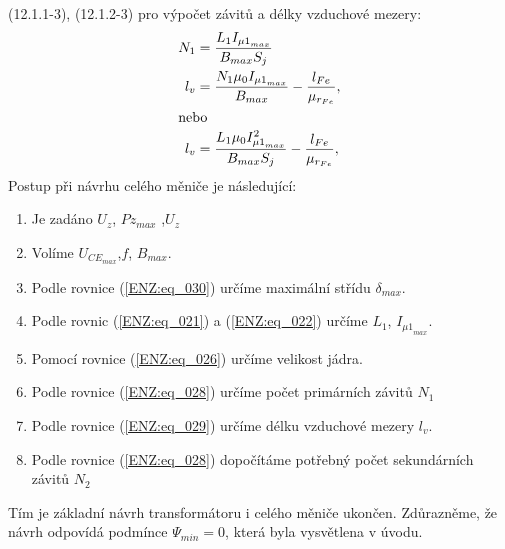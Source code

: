     (12.1.1-3), (12.1.2-3) pro výpočet závitů a délky vzduchové mezery:
    \begin{align}
      N_1 &= \frac{L_1I_{{\mu1}_{max}}}{B_{max}S_j}          \nonumber          \\
      l_v &= \frac{N_1\mu_0I_{{\mu1}_{max}}}{B_{max}} 
           - \frac{l_{Fe}}{\mu_{r_{Fe}}},                    \label{ENZ:eq_028} \\
      \shortintertext{nebo}
      l_v &= \frac{L_1\mu_0I^2_{{\mu1}_{max}}}{B_{max}S_j} 
             - \frac{l_{Fe}}{\mu_{r_{Fe}}},                  \label{ENZ:eq_029}  
    \end{align}
    Postup při návrhu celého měniče je následující:
    \begin{enumerate}[noitemsep]
      \item Je zadáno \(U_z\), \(P{z_{max}}\) ,\(U_z\)
      \item Volíme \(U_{CE_{max}}\),\(f\), \(B_{max}\).
      \item Podle rovnice (\ref{ENZ:eq_030}) určíme maximální střídu \(\delta_{max}\).
      \item Podle rovnic (\ref{ENZ:eq_021}) a (\ref{ENZ:eq_022}) určíme \(L_1\), 
            \(I_{{\mu1}_{max}}\).
      \item Pomocí rovnice (\ref{ENZ:eq_026}) určíme velikost jádra.
      \item Podle rovnice (\ref{ENZ:eq_028}) určíme počet primárních závitů \(N_1\)
      \item Podle rovnice (\ref{ENZ:eq_029}) určíme délku vzduchové mezery \(l_v\).
      \item Podle rovnice (\ref{ENZ:eq_028}) dopočítáme potřebný počet sekundárních závitů \(N_2\)
    \end{enumerate}
    Tím je základní návrh transformátoru i celého měniče ukončen. Zdůrazněme, že návrh odpovídá 
    podmínce \(\Psi_{min}= 0\), která byla vysvětlena v úvodu.
  
